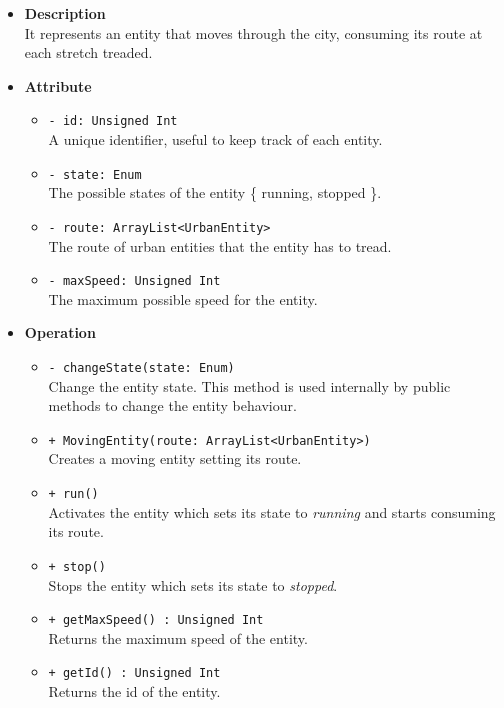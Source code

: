 \begin{itemize}
  \item \textbf{Description} \\
    It represents an entity that moves through the city, consuming its 
route at each stretch treaded.
  \item \textbf{Attribute}
  \begin{itemize}
    \item \texttt{- id: Unsigned Int} \\
A unique identifier, useful to keep track of each entity.
    \item \texttt{- state: Enum} \\
The possible states of the entity \{ running, stopped \}.
    \item \texttt{- route: ArrayList<UrbanEntity>} \\
The route of urban entities that the entity has to tread.
    \item \texttt{- maxSpeed: Unsigned Int} \\
The maximum possible speed for the entity.
  \end{itemize}
  \item \textbf{Operation}
  \begin{itemize}
    \item \texttt{- changeState(state: Enum)} \\
Change the entity state. This method is used internally by public methods to 
change the entity behaviour.
    \item  \texttt{+ MovingEntity(route: ArrayList<UrbanEntity>)} \\
Creates a moving entity setting its route.
    \item  \texttt{+ run()} \\
Activates the entity which sets its state to \textit{running} and 
starts consuming its route.
    \item  \texttt{+ stop()} \\
Stops the entity which sets its state to \textit{stopped}.
    \item  \texttt{+ getMaxSpeed() : Unsigned Int} \\
Returns the maximum speed of the entity.
     \item  \texttt{+ getId() : Unsigned Int} \\
Returns the id of the entity. 
  \end{itemize}
\end{itemize}
